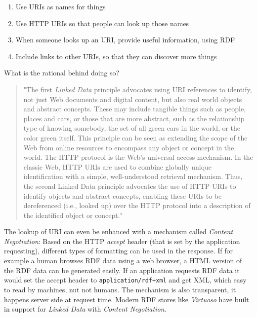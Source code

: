 \begin{enumerate}
\item Use URIs as names for things
\item Use HTTP URIs so that people can look up those names
\item When someone looks up an URI, provide useful information, using RDF
\item Include links to other URIs, so that they can discover more things
\end{enumerate}
What is the rational behind doing so? 
\begin{quotation}
"The first \textit{Linked Data} principle advocates using URI references to identify, not just Web documents and digital content, but also real world objects and abstract concepts. 
These may include tangible things such as people, places and cars, or those that are more abstract, such as the relationship type of knowing somebody, the set of all green cars in the world, or the color green itself. 
This principle can be seen as extending the scope of the Web from online resources to encompass any object or concept in the world. 
The HTTP protocol is the Web’s universal access mechanism. 
In the classic Web, HTTP URIs are used to combine globally unique identification with a simple, well-understood retrieval mechanism. 
Thus, the second Linked Data principle advocates the use of HTTP URIs to identify objects and abstract concepts, enabling these URIs to be dereferenced (i.e., looked up) over the HTTP protocol into a description of the identified object or concept."~\cite{linkeddata-book}
\end{quotation}
The lookup of URI can even be enhanced with a mechanism called \textit{Content Negotiation}: Based on the HTTP \textit{accept} header (that is set by the application requesting), different types of formatting can be used in the response. 
If for example a human browses RDF data using a web browser, a HTML version of the RDF data can be generated easily. 
If an application requests RDF data it would set the accept header to \texttt{application/rdf+xml} and get XML, which easy to read by machines, nut not humans. The mechanism is also transparent, it happens server side at request time. 
Modern RDF stores like \textit{Virtuoso} have built in support for \textit{Linked Data} with \textit{Content Negotiation}.

